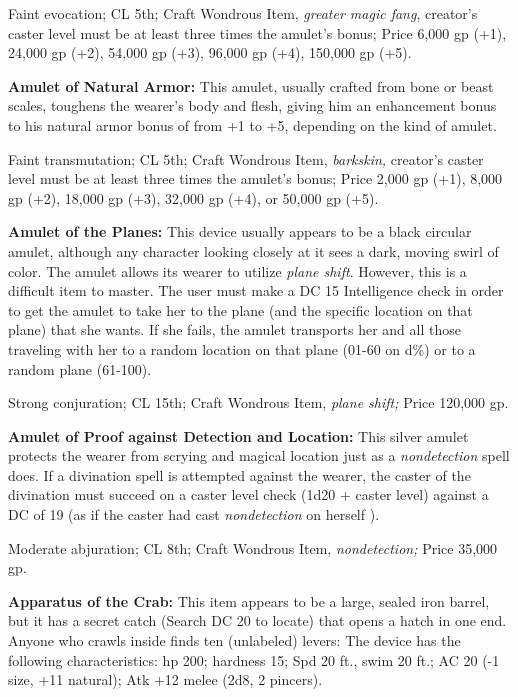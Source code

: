 Faint evocation; CL 5th; Craft Wondrous Item, \textit{greater magic fang}, creator's 
caster level must be at least three times the amulet's bonus; Price 6,000 gp (+1), 
24,000 gp (+2), 54,000 gp (+3), 96,000 gp (+4), 150,000 gp (+5).

\textbf{Amulet of Natural Armor:} This amulet, usually crafted from bone or beast 
scales, toughens the wearer's body and flesh, giving him an enhancement bonus to 
his natural armor bonus of from +1 to +5, depending on the kind of amulet.

Faint transmutation; CL 5th; Craft Wondrous Item, \textit{barkskin, }creator's 
caster level must be at least three times the amulet's bonus; Price 2,000 gp (+1), 
8,000 gp (+2), 18,000 gp (+3), 32,000 gp (+4), or 50,000 gp (+5).

\textbf{Amulet of the Planes:} This device usually appears to be a black circular 
amulet, although any character looking closely at it sees a dark, moving swirl 
of color. The amulet allows its wearer to utilize \textit{plane shift}. However, 
this is a difficult item to master. The user must make a DC 15 Intelligence check 
in order to get the amulet to take her to the plane (and the specific location 
on that plane) that she wants. If she fails, the amulet transports her and all 
those traveling with her to a random location on that plane (01-60 on d\%) or to 
a random plane (61-100).

Strong conjuration; CL 15th; Craft Wondrous Item, \textit{plane shift; }Price 120,000 
gp.

\textbf{Amulet of Proof against Detection and Location:} This silver amulet protects 
the wearer from scrying and magical location just as a \textit{nondetection }spell 
does. If a divination spell is attempted against the wearer, the caster of the 
divination must succeed on a caster level check (1d20 + caster level) against a 
DC of 19 (as if the caster had cast \textit{nondetection }on herself ).

Moderate abjuration; CL 8th; Craft Wondrous Item, \textit{nondetection; }Price 
35,000 gp.

\textbf{Apparatus of the Crab:} This item appears to be a large, sealed iron barrel, 
but it has a secret catch (Search DC 20 to locate) that opens a hatch in one end. 
Anyone who crawls inside finds ten (unlabeled) levers: The device has the following 
characteristics: hp 200; hardness 15; Spd 20 ft., swim 20 ft.; AC 20 (-1 size, 
+11 natural); Atk +12 melee (2d8, 2 pincers).

